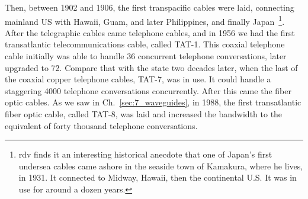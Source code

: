 Then, between 1902 and 1906, the first transpacific cables were laid, connecting mainland US with Hawaii, Guam, and later Philippines, and finally Japan~\footnote{rdv finds it an interesting historical anecdote that one of Japan's first undersea cables came ashore in the seaside town of Kamakura, where he lives, in 1931.  It connected to Midway, Hawaii, then the continental U.S.  It was in use for around a dozen years.}. After the telegraphic cables came telephone cables, and in 1956 we had the first transatlantic telecommunications cable, called TAT-1. This coaxial telephone cable initially was able to handle 36 concurrent telephone conversations, later upgraded to 72. 
Compare that with the state two decades later, when the last of the coaxial copper 
telephone cables, TAT-7, was in use. It could handle a staggering 4000 telephone conversations concurrently. After this came the fiber optic cables. As we saw in Ch.~\ref{sec:7_waveguides}, in 1988, the first transatlantic fiber optic cable, called TAT-8, was laid and increased the bandwidth to the equivalent of forty thousand telephone conversations.

